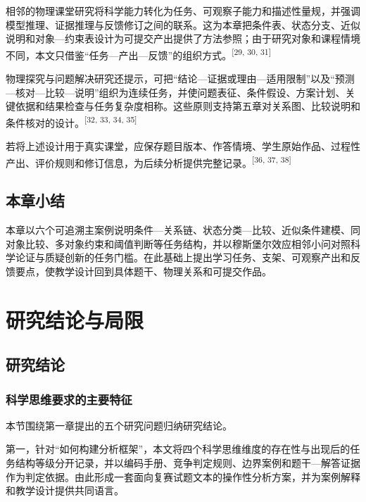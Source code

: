 \documentclass[
  12pt,
  a4paper,twoside,openany]{ctexbook}
\begin{document}
相邻的物理课堂研究将科学能力转化为任务、可观察子能力和描述性量规，并强调模型推理、证据推理与反馈修订之间的联系。这为本章把条件表、状态分支、近似说明和对象---约束表设计为可提交产出提供了方法参照；由于研究对象和课程情境不同，本文只借鉴``任务---产出---反馈''的组织方式。\textsuperscript{[29, 30, 31]}

物理探究与问题解决研究还提示，可把``结论---证据或理由---适用限制''以及``预测---核对---比较---说明''组织为连续任务，并使问题表征、条件假设、方案计划、关键依据和结果检查与任务复杂度相称。这些原则支持第五章对关系图、比较说明和条件核对的设计。\textsuperscript{[32, 33, 34, 35]}

若将上述设计用于真实课堂，应保存题目版本、作答情境、学生原始作品、过程性产出、评价规则和修订信息，为后续分析提供完整记录。\textsuperscript{[36, 37, 38]}

\section{本章小结}\label{ux672cux7ae0ux5c0fux7ed3-3}

\enlargethispage{2\baselineskip}

本章以六个可追溯主案例说明条件---关系链、状态分类---比较、近似条件建模、同对象比较、多对象约束和阈值判断等任务结构，并以穆斯堡尔效应相邻小问对照科学论证与质疑创新的任务门槛。在此基础上提出学习任务、支架、可观察产出和反馈要点，使教学设计回到具体题干、物理关系和可提交作品。

\chapter{研究结论与局限}\label{ux7814ux7a76ux7ed3ux8bbaux4e0eux5c40ux9650}

\section{研究结论}\label{ux7814ux7a76ux7ed3ux8bba}

\subsection{科学思维要求的主要特征}\label{ux79d1ux5b66ux601dux7ef4ux8981ux6c42ux7684ux4e3bux8981ux7279ux5f81}

本节围绕第一章提出的五个研究问题归纳研究结论。

第一，针对``如何构建分析框架''，本文将四个科学思维维度的存在性与出现后的任务结构等级分开记录，并以编码手册、竞争判定规则、边界案例和题干---解答证据作为判定依据。由此形成一套面向复赛试题文本的操作性分析方案，并为案例解释和教学设计提供共同语言。
\end{document}
